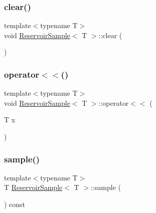 \mbox{\label{class_reservoir_sample_a8527b800cc94f227a7793e8c93055d82}} 
\subsubsection{\texorpdfstring{clear()}{clear()}}
{\footnotesize\ttfamily template$<$typename T$>$ \\
void \hyperlink{class_reservoir_sample}{Reservoir\+Sample}$<$ T $>$\+::clear (\begin{DoxyParamCaption}{ }\end{DoxyParamCaption})\hspace{0.3cm}{\ttfamily [inline]}}

\mbox{\label{class_reservoir_sample_a06e60e404cf49a9261f51d6b07bbf017}} 
\subsubsection{\texorpdfstring{operator$<$$<$()}{operator<<()}}
{\footnotesize\ttfamily template$<$typename T$>$ \\
void \hyperlink{class_reservoir_sample}{Reservoir\+Sample}$<$ T $>$\+::operator$<$$<$ (\begin{DoxyParamCaption}\item[{T}]{x }\end{DoxyParamCaption})\hspace{0.3cm}{\ttfamily [inline]}}

\mbox{\label{class_reservoir_sample_adc52ee8c3b5cbb7fd364315614d35595}} 
\subsubsection{\texorpdfstring{sample()}{sample()}}
{\footnotesize\ttfamily template$<$typename T$>$ \\
T \hyperlink{class_reservoir_sample}{Reservoir\+Sample}$<$ T $>$\+::sample (\begin{DoxyParamCaption}{ }\end{DoxyParamCaption}) const\hspace{0.3cm}{\ttfamily [inline]}}

